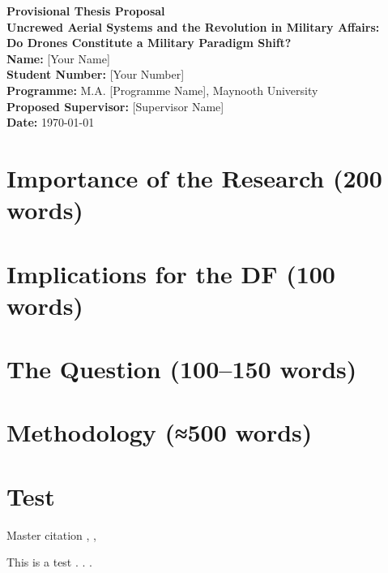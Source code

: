\documentclass[12pt,a4paper]{scrreprt}
\begin{document}
\begin{titlepage}
	\begin{center}
		{\Large \textbf{Provisional Thesis Proposal}}\\[1.2em]
		{\large \textbf{Uncrewed Aerial Systems and the Revolution in Military Affairs:\\
				Do Drones Constitute a Military Paradigm Shift?}}\\[2em]
		\textbf{Name:} [Your Name] \\
		\textbf{Student Number:} [Your Number] \\
		\textbf{Programme:} M.A. [Programme Name], Maynooth University \\
		\textbf{Proposed Supervisor:} [Supervisor Name] \\
		\textbf{Date:} \today
	\end{center}
\end{titlepage}

\chapter*{Importance of the Research (200 words)}

\chapter*{Implications for the DF (100 words)}

\chapter*{The Question (100–150 words)}

\chapter*{Methodology (≈500 words)}




	\chapter*{Test}
	
	
	Master citation \parencite{AAAA_2025_Book},	\parencite{AAAA_2025_Online},	\parencite{AAAA_2025_Article}
	
	This is a test \parencite{SCHAUS_2018}.
	\cite{CRINO_2020}.
	\parencite{STIMSON_2015}.
	\parencite{RASSLER_2015}
	
	\medskip
	
	\printbibliography[
	heading=bibintoc,
	title={Adam's bibliography}
	]
	
\end{document}
